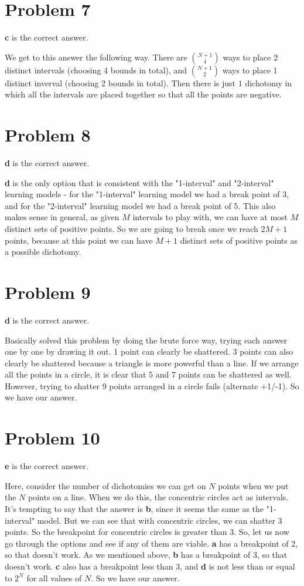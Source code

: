 \documentclass{article}
\begin{document}
\section*{Problem 7}
\textbf{c} is the correct answer.

\noindent We get to this answer the following way. There are $\binom{N+1}{4}$
ways to place 2 distinct intervals (choosing 4 bounds in total),
and $\binom{N+1}{2}$ ways to place 1 distinct inverval (choosing 2 bounds in
total). Then there is just $1$ dichotomy in which all the intervals are placed
together so that all the points are negative.
\section*{Problem 8}
\textbf{d} is the correct answer.

\noindent \textbf{d} is the only option that is consistent with the "1-interval"
and "2-interval" learning models - for the "1-interval" learning model we had
a break point of 3, and for the "2-interval" learning model we had a break point
of 5. This also makes sense in general, as given $M$ intervals to play with,
we can have at most $M$ distinct sets of positive points. So we are going to break
once we reach $2M + 1$ points, because at this point we can have $M+1$ distinct
sets of positive points as a possible dichotomy.
\section*{Problem 9}
\textbf{d} is the correct answer.

\noindent Basically solved this problem by doing the brute force way, trying
each answer one by one by drawing it out.
1 point can clearly be shattered. 3 points can also
clearly be shattered because a triangle is more powerful than a line. If we
arrange all the points in a circle, it is clear that 5 and 7 points can be
shattered as well. However, trying to shatter 9 points arranged in a circle
fails (alternate +1/-1). So we have our answer.
\section*{Problem 10}
\textbf{e} is the correct answer.

\noindent Here, consider the number of dichotomies we can get on $N$ points
when we put the $N$ points on a line. When we do this, the concentric circles
act as intervals. It's tempting to say that the answer is \textbf{b}, since
it seems the same as the "1-interval" model. But we can see that with
concentric circles, we can shatter 3 points. So the breakpoint for concentric
circles is greater than 3. So, let us now go through the options and see if
any of them are viable. \textbf{a} has a breakpoint of 2, so that doesn't
work. As we mentioned above, \textbf{b} has a breakpoint of 3, so that doesn't
work. \textbf{c} also has a breakpoint less than 3, and \textbf{d} is not
less than or equal to $2^N$ for all values of $N$. So we have our answer.
\end{document}
